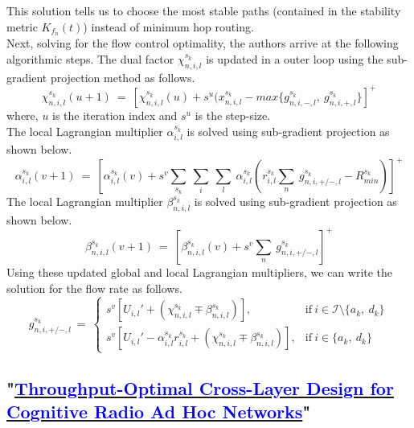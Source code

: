 \documentclass[12pt, draftcls, onecolumn]{IEEEtran}
\begin{document}
This solution tells us to choose the most stable paths (contained in the stability metric $K_{f_n}(t)$) instead of minimum hop routing.
\\Next, solving for the flow control optimality, the authors arrive at the following algorithmic steps.
The dual factor $\chi_{n,i,l}^{s_k}$ is updated in a outer loop using the sub-gradient projection method as follows.
\[\chi_{n,i,l}^{s_k}(u+1)\ =\ [\chi_{n,i,l}^{s_k}(u) + s^u(x_{n,i,l}^{s_k} - max\{g_{n,i,-,l}^{s_k},\ g_{n,i,+,l}^{s_k}\}]^+\]
where, $u$ is the iteration index and $s^u$ is the step-size.
\\The local Lagrangian multiplier $\alpha_{i,l}^{s_k}$ is solved using sub-gradient projection as shown below.
\[\alpha_{i,l}^{s_k}(v+1)\ =\ [\alpha_{i,l}^{s_k}(v) + s^v \sum_{s_k}\ \sum_{i}\ \sum_{l}\ \alpha_{i,l}^{s_k}(r_{i,l}^{s_k}\sum_n\ g_{n,i,+/-,l}^{s_k} - R_{min}^{s_k})]^+\]
The local Lagrangian multiplier $\beta_{n,i,l}^{s_k}$ is solved using sub-gradient projection as shown below.
\[\beta_{n,i,l}^{s_k}(v+1)\ =\ [\beta_{n,i,l}^{s_k}(v) + s^v \sum_n\ g_{n,i,+/-,l}^{s_k}]^+\]
Using these updated global and local Lagrangian multipliers, we can write the solution for the flow rate as follows.
\begin{equation*}
    g_{n,i,+/-,l}^{s_k}\ =\ 
    \begin{cases}
        s^v[U_{i,l}' + (\chi_{n,i,l}^{s_k} \mp \beta_{n,i,l}^{s_k})], & \text{if}\ i \in \mathcal{I}\setminus\{a_k,\ d_k\}\\
        s^v[U_{i,l}' - \alpha_{i,l}^{s_k} r_{i,l}^{s_k} + (\chi_{n,i,l}^{s_k} \mp \beta_{n,i,l}^{s_k})], & \text{if}\ i \in \{a_k,\ d_k\}
    \end{cases}
\end{equation*}
\subsection{"\href{http://ieeexplore.ieee.org/stamp/stamp.jsp?tp=&arnumber=6881740&isnumber=7180482}{\textcolor{blue}{Throughput-Optimal Cross-Layer Design for Cognitive Radio Ad Hoc Networks}}"}
\end{document}
